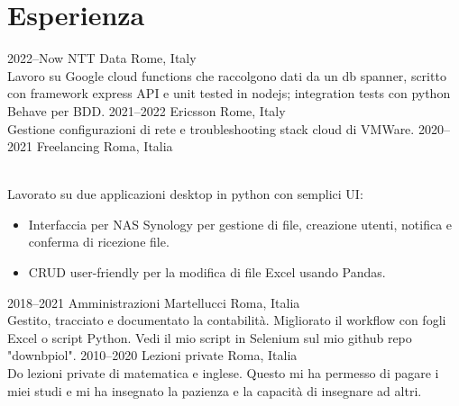 \documentclass[]{cv-style}          %
\begin{document}
\section{Esperienza}

\begin{entrylist}
    \entry
    {2022--Now}
    {NTT Data}
    {Rome, Italy}
    {\\
    Lavoro su Google cloud functions che raccolgono dati da un db spanner, scritto con framework express API e unit tested in nodejs; integration tests con python Behave per BDD.
    }
    \entry
    {2021--2022}
    {Ericsson}
    {Rome, Italy}
    {\\
    Gestione configurazioni di rete e troubleshooting stack cloud di VMWare.}
\entry
  {2020--2021}
  {Freelancing}
  {Roma, Italia}
  {\\
  Lavorato su due applicazioni desktop in python con semplici UI:
  \begin{itemize}
  \item Interfaccia per NAS Synology per gestione di file, creazione utenti, notifica e conferma di ricezione file.
  \item CRUD user-friendly per la modifica di file Excel usando Pandas.
  \end{itemize}
}
\entry
  {2018--2021}
  {Amministrazioni Martellucci}
  {Roma, Italia}
  {\\
  Gestito, tracciato e documentato la contabilità. Migliorato il workflow con fogli Excel o script Python. Vedi il mio script in Selenium sul mio github repo "downbpiol".
}
\entry
  {2010--2020}
  {Lezioni private}
  {Roma, Italia}
  {\\
    Do lezioni private di matematica e inglese. Questo mi ha permesso di pagare i miei studi e mi ha insegnato la pazienza e la capacità di insegnare ad altri.
  }
\end{entrylist}

\end{document}
